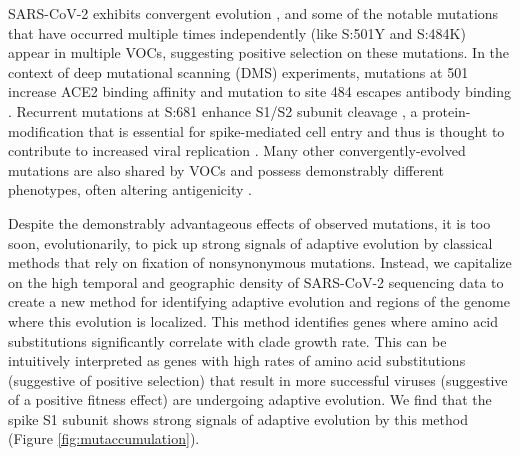 \documentclass[11pt,oneside,letterpaper]{article}
\begin{document}
SARS-CoV-2 exhibits convergent evolution \cite{Van_Dorp2020-ox, Martin2021-lj, Rochman2021-sv}, and some of the notable mutations that have occurred multiple times independently (like S:501Y and S:484K) appear in multiple VOCs, suggesting positive selection on these mutations.
In the context of deep mutational scanning (DMS) experiments, mutations at 501 increase ACE2 binding affinity \cite{Starr2020-bt} and mutation to site 484 escapes antibody binding \cite{Greaney2021-jn}.
Recurrent mutations at S:681 enhance S1/S2 subunit cleavage \cite{Lubinski2021-ul, Liu2021-ne}, a protein-modification that is essential for spike-mediated cell entry \cite{Hoffmann2020-vi} and thus is thought to contribute to increased viral replication \cite{Liu2021-ne}.
Many other convergently-evolved mutations are also shared by VOCs and possess demonstrably different phenotypes, often altering antigenicity \cite{Li2020-jd, McCarthy2021-lg, Wang2021-dm}.

Despite the demonstrably advantageous effects of observed mutations, it is too soon, evolutionarily, to pick up strong signals of adaptive evolution by classical methods that rely on fixation of nonsynonymous mutations.
Instead, we capitalize on the high temporal and geographic density of SARS-CoV-2 sequencing data to create a new method for identifying adaptive evolution and regions of the genome where this evolution is localized.
This method identifies genes where amino acid substitutions significantly correlate with clade growth rate.
This can be intuitively interpreted as genes with high rates of amino acid substitutions (suggestive of positive selection) that result in more successful viruses (suggestive of a positive fitness effect) are undergoing adaptive evolution.
We find that the spike S1 subunit shows strong signals of adaptive evolution by this method (Figure \ref{fig:mutaccumulation}). 
\end{document}
